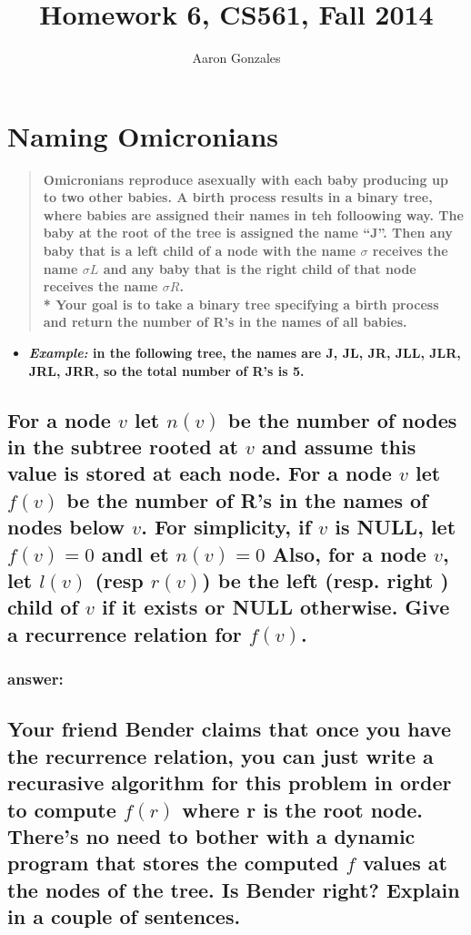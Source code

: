 \documentclass[titlepage]{article}\usepackage[]{graphicx}\usepackage[]{color}
\begin{document}
\title{Homework 6, CS561, Fall 2014}
\author{Aaron Gonzales}
\maketitle

\section{Naming Omicronians}
\begin{quote}
  \textbf{Omicronians reproduce asexually with each baby producing up to two
  other babies. A birth process results in a binary tree, where babies are
  assigned their names in teh folloowing way. The baby at the root of the tree
  is assigned the name ``J''. Then any baby that is a left child of a node with
  the name $\sigma$ receives the name $\sigma L$ and any baby that is the right
  child of that node receives the name $\sigma R$. \\*
  Your goal is to take a binary tree specifying a birth process and return the
  number of R's in the names of all babies.}
\end{quote}
\begin{itemize}
	\item \textbf{\emph{Example:} in the following tree, the names are J, JL,
	JR, JLL, JLR, JRL, JRR, so the total number of R's is 5.  }
\end{itemize}

\subsection{For a node $v$ let $n(v)$ be the number of nodes in the subtree
	rooted at $v$ and assume this value is stored at each node. For a node $v$
	let $f(v)$ be the number of R's in the names of nodes below $v$. For
	simplicity, if $v$ is NULL, let $f(v) = 0$ andl et $n(v) = 0$ Also, for a
	node $v$, let $l(v)$ (resp $r(v)$) be the left (resp. right ) child of $v$
	if it exists or NULL otherwise. Give a recurrence relation for $f(v)$.}
\subsubsection{answer:}
\vspace{5cm}

\subsection{Your friend Bender claims that once you have the recurrence
	relation, you can just write a recurasive algorithm for this problem in
	order to compute $f(r)$ where r is the root node. There's no need to bother
	with a dynamic program that stores the computed $f$ values at the nodes of
	the tree. Is Bender right? Explain in a couple of sentences.}
\end{document}
